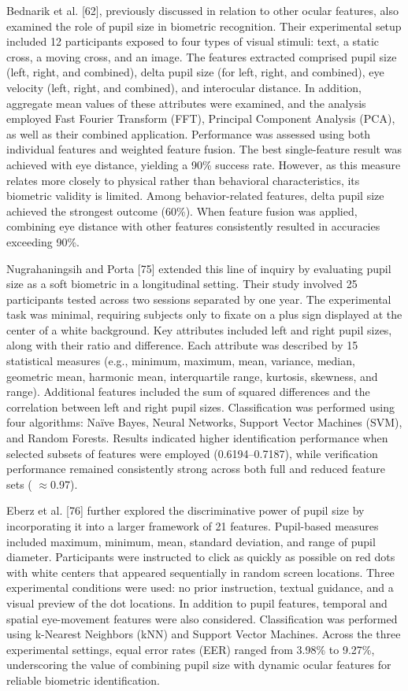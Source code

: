 \documentclass{article}
\begin{document}
Bednarik et al. [62], previously discussed in relation to other ocular features, also examined the role of pupil size in biometric recognition. 
Their experimental setup included 12 participants exposed to four types of visual stimuli: text, a static cross, a moving cross, and an image.
The features extracted comprised pupil size (left, right, and combined), delta pupil size (for left, right, and combined), eye velocity (left, right, and combined), and interocular distance.
In addition, aggregate mean values of these attributes were examined, and the analysis employed Fast Fourier Transform (FFT), Principal Component Analysis (PCA), as well as their combined application.
Performance was assessed using both individual features and weighted feature fusion. 
The best single-feature result was achieved with eye distance, yielding a 90\% success rate.
However, as this measure relates more closely to physical rather than behavioral characteristics, its biometric validity is limited.
Among behavior-related features, delta pupil size achieved the strongest outcome (60\%). When feature fusion was applied, combining eye distance with other features consistently resulted in accuracies exceeding 90\%.

Nugrahaningsih and Porta [75] extended this line of inquiry by evaluating pupil size as a soft biometric in a longitudinal setting. 
Their study involved 25 participants tested across two sessions separated by one year. 
The experimental task was minimal, requiring subjects only to fixate on a plus sign displayed at the center of a white background.
Key attributes included left and right pupil sizes, along with their ratio and difference.
Each attribute was described by 15 statistical measures (e.g., minimum, maximum, mean, variance, median, geometric mean, harmonic mean, interquartile range, kurtosis, skewness, and range). 
Additional features included the sum of squared differences and the correlation between left and right pupil sizes.
Classification was performed using four algorithms: Naïve Bayes, Neural Networks, Support Vector Machines (SVM), and Random Forests.
Results indicated higher identification performance when selected subsets of features were employed (0.6194–0.7187), while verification performance remained consistently strong across both full and reduced feature sets ( $\approx$0.97).

Eberz et al. [76] further explored the discriminative power of pupil size by incorporating it into a larger framework of 21 features.
Pupil-based measures included maximum, minimum, mean, standard deviation, and range of pupil diameter. 
Participants were instructed to click as quickly as possible on red dots with white centers that appeared sequentially in random screen locations.
Three experimental conditions were used: no prior instruction, textual guidance, and a visual preview of the dot locations. 
In addition to pupil features, temporal and spatial eye-movement features were also considered. 
Classification was performed using k-Nearest Neighbors (kNN) and Support Vector Machines. 
Across the three experimental settings, equal error rates (EER) ranged from 3.98\% to 9.27\%, underscoring the value of combining pupil size with dynamic ocular features for reliable biometric identification.
\end{document}
